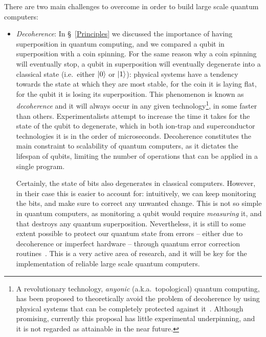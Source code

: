 There are two main challenges to overcome in order to build large scale quantum computers:

\begin{itemize}

  \item \textit{Decoherence}: In \S~\ref{Principles} we discussed the importance of having superposition in quantum computing, and we compared a qubit in superposition with a coin spinning. For the same reason why a coin spinning will eventually stop, a qubit in superposition will eventually degenerate into a classical state (i.e.\ either \(\vert 0 \rangle\) or \(\vert 1 \rangle\)): physical systems have a tendency towards the state at which they are most stable, for the coin it is laying flat, for the qubit it is losing its superposition. This phenomenon is known as \textit{decoherence} and it will always occur in any given technology\footnote{A revolutionary technology, \textit{anyonic} (a.k.a.\ topological) quantum computing, has been proposed to theoretically avoid the problem of decoherence by using physical systems that can be completely protected against it~\citep{Anyonic}. Although promising, currently this proposal has little experimental underpinning, and it is not regarded as attainable in the near future.}, in some faster than others. Experimentalists attempt to increase the time it takes for the state of the qubit to degenerate, which in both ion-trap and superconductor technologies it is in the order of microseconds. Decoherence constitutes the main constraint to scalability of quantum computers, as it dictates the lifespan of qubits, limiting the number of operations that can be applied in a single program. 

  Certainly, the state of bits also degenerates in classical computers. However, in their case this is easier to account for: intuitively, we can keep monitoring the bits, and make sure to correct any unwanted change. This is not so simple in quantum computers, as monitoring a qubit would require \textit{measuring} it, and that destroys any quantum superposition. Nevertheless, it is still to some extent possible to protect our quantum state from errors -- either due to decoherence or imperfect hardware -- through quantum error correction routines~\citep{QuantumErrorCorrection}. This is a very active area of research, and it will be key for the implementation of reliable large scale quantum computers.



\end{itemize}
